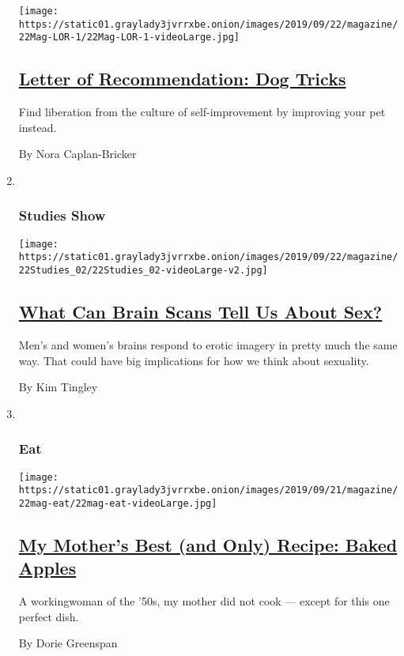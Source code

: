 \begin{enumerate}
  \texttt{[image: https://static01.graylady3jvrrxbe.onion/images/2019/09/22/magazine/22Mag-LOR-1/22Mag-LOR-1-videoLarge.jpg]}

  \hypertarget{letter-of-recommendation-dog-tricks}{%
  \subsection{\texorpdfstring{\href{/2019/09/17/magazine/letter-of-recommendation-dog-tricks.html}{Letter
  of Recommendation: Dog
  Tricks}}{Letter of Recommendation: Dog Tricks}}\label{letter-of-recommendation-dog-tricks}}

  Find liberation from the culture of self-improvement by improving your
  pet instead.

  By Nora Caplan-Bricker
\item ~
  \hypertarget{studies-show}{%
  \subsubsection{Studies Show}\label{studies-show}}

  \texttt{[image: https://static01.graylady3jvrrxbe.onion/images/2019/09/22/magazine/22Studies\_02/22Studies\_02-videoLarge-v2.jpg]}

  \hypertarget{what-can-brain-scans-tell-us-about-sex}{%
  \subsection{\texorpdfstring{\href{/2019/09/18/magazine/sex-brain-scans-men-women.html}{What
  Can Brain Scans Tell Us About
  Sex?}}{What Can Brain Scans Tell Us About Sex?}}\label{what-can-brain-scans-tell-us-about-sex}}

  Men's and women's brains respond to erotic imagery in pretty much the
  same way. That could have big implications for how we think about
  sexuality.

  By Kim Tingley
\item ~
  \hypertarget{eat}{%
  \subsubsection{Eat}\label{eat}}

  \texttt{[image: https://static01.graylady3jvrrxbe.onion/images/2019/09/21/magazine/22mag-eat/22mag-eat-videoLarge.jpg]}

  \hypertarget{my-mothers-best-and-only-recipe-baked-apples}{%
  \subsection{\texorpdfstring{\href{/2019/09/18/magazine/mothers-best-recipe-baked-apples.html}{My
  Mother's Best (and Only) Recipe: Baked
  Apples}}{My Mother's Best (and Only) Recipe: Baked Apples}}\label{my-mothers-best-and-only-recipe-baked-apples}}

  A workingwoman of the '50s, my mother did not cook --- except for this
  one perfect dish.

  By Dorie Greenspan
\end{enumerate}

